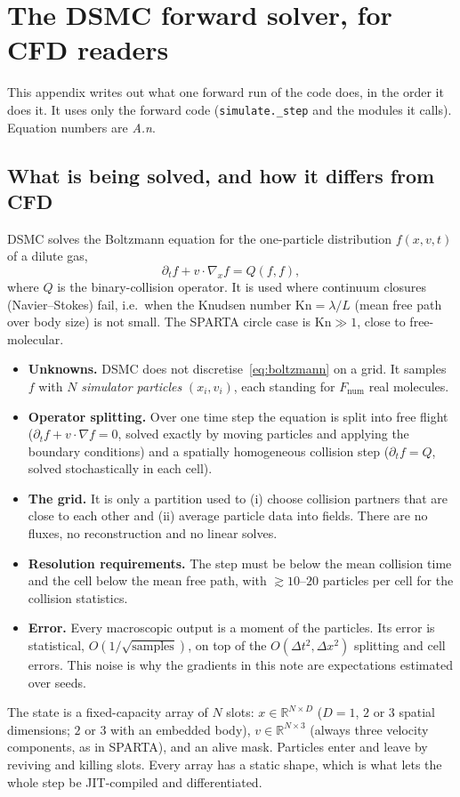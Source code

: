 \documentclass[11pt,a4paper]{article}
\numberwithin{equation}{section}
\newcommand{\R}{\mathbb{R}}
\newcommand{\code}[1]{\texttt{#1}}
\begin{document}
\appendix

\section{The DSMC forward solver, for CFD readers}
\label{sec:dsmc-primer}

This appendix writes out what one forward run of the code does, in the order it does
it.  It uses only the forward code (\code{simulate.\_step} and the modules it calls).
Equation numbers are \emph{A.n}.

\subsection{What is being solved, and how it differs from CFD}

DSMC solves the Boltzmann equation for the one-particle distribution
$f(x, v, t)$ of a dilute gas,
\begin{equation}
\label{eq:boltzmann}
\partial_t f + v\cdot\nabla_x f = Q(f, f),
\end{equation}
where $Q$ is the binary-collision operator.  It is used where continuum closures
(Navier--Stokes) fail, i.e.\ when the Knudsen number
$\mathrm{Kn} = \lambda/L$ (mean free path over body size) is not small.  The SPARTA
circle case is $\mathrm{Kn}\gg 1$, close to free-molecular.
\begin{itemize}
\item \textbf{Unknowns.}  DSMC does not discretise~\eqref{eq:boltzmann} on a grid.  It
  samples $f$ with $N$ \emph{simulator particles} $(x_i, v_i)$, each standing for
  $F_{\mathrm{num}}$ real molecules.
\item \textbf{Operator splitting.}  Over one time step the equation is split into free
  flight ($\partial_t f + v\cdot\nabla f = 0$, solved exactly by moving particles and
  applying the boundary conditions) and a spatially homogeneous collision step
  ($\partial_t f = Q$, solved stochastically in each cell).
\item \textbf{The grid.}  It is only a partition used to (i) choose collision partners
  that are close to each other and (ii) average particle data into fields.  There are
  no fluxes, no reconstruction and no linear solves.
\item \textbf{Resolution requirements.}  The step must be below the mean collision
  time and the cell below the mean free path, with $\gtrsim 10$--$20$ particles per
  cell for the collision statistics.
\item \textbf{Error.}  Every macroscopic output is a moment of the particles.  Its
  error is statistical, $O(1/\sqrt{\text{samples}})$, on top of the $O(\Delta t^2,
  \Delta x^2)$ splitting and cell errors.  This noise is why the gradients in this
  note are expectations estimated over seeds.
\end{itemize}
The state is a fixed-capacity array of $N$ slots: $x\in\R^{N\times D}$ ($D = 1$, $2$ or
$3$ spatial dimensions; $2$ or $3$ with an embedded body), $v\in\R^{N\times 3}$ (always three velocity components, as in
SPARTA), and an alive mask.  Particles enter and leave by reviving and killing
slots.  Every array has a static shape, which is what lets the whole step be
JIT-compiled and differentiated.
\end{document}
